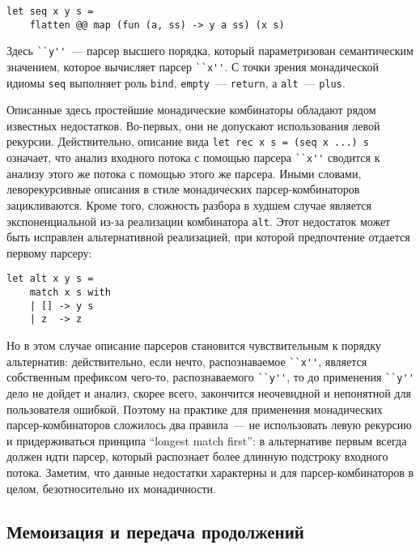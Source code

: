 \documentclass[conference]{IEEEtran}
\begin{document}
\begin{lstlisting}[basicstyle=\small]
  let seq x y s =
    flatten @@ map (fun (a, ss) -> y a ss) (x s)
\end{lstlisting}

Здесь \lstinline|``y''|~--- парсер высшего порядка, который параметризован семантическим значением, которое вычисляет парсер \lstinline|``x''|. С точки зрения монадической
идиомы \lstinline|seq| выполняет роль \lstinline|bind|, \lstinline|empty|~--- \lstinline|return|, а \lstinline|alt|~--- \lstinline|plus|.

Описанные здесь простейшие монадические комбинаторы обладают рядом известных недостатков. Во-первых, они не допускают использования левой рекурсии. Действительно, описание
вида \lstinline|let rec x s = (seq x ...) s| означает, что анализ входного потока с помощью парсера \lstinline|``x''| сводится к анализу этого же потока с помощью этого
же парсера. Иными словами, леворекурсивные описания в стиле монадических парсер-комбинаторов зацикливаются. Кроме того, сложность разбора в худшем случае является экспоненциальной
из-за реализации комбинатора \lstinline|alt|. Этот недостаток может быть исправлен альтернативной реализацией, при которой предпочтение отдается первому парсеру:

\begin{lstlisting}[basicstyle=\small]
  let alt x y s =
    match x s with
    | [] -> y s
    | z  -> z
\end{lstlisting}

Но в этом случае описание парсеров становится чувствительным к порядку альтернатив: действительно, если нечто, распознаваемое \lstinline|``x''|, является собственным префиксом
чего-то, распознаваемого \lstinline|``y''|, то до применения \lstinline|``y''| дело не дойдет и анализ, скорее всего, закончится неочевидной и непонятной для
пользователя ошибкой. Поэтому на практике для применения монадических парсер-комбинаторов сложилось два правила~--- не использовать левую рекурсию и придерживаться
принципа ``longest match first'': в альтернативе первым всегда должен идти парсер, который распознает более длинную подстроку входного потока. Заметим, что данные недостатки
характерны и для парсер-комбинаторов в целом, безотносительно их монадичности.

\subsection{Мемоизация и передача продолжений}
\end{document}
